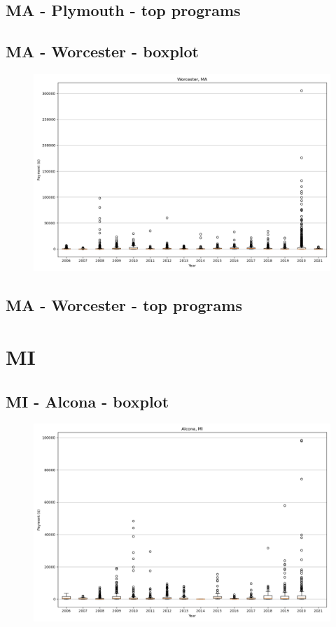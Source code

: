 \subsection*{MA - Plymouth - top programs}

\newpage
\subsection*{MA - Worcester - boxplot}
\begin{figure}[h]
\centering
\includegraphics[width=7in]{../output/boxplots/counties/Worcester-MA_boxplot.png}
\end{figure}


\subsection*{MA - Worcester - top programs}

\newpage
\section*{MI}
\subsection*{MI - Alcona - boxplot}
\begin{figure}[h]
\centering
\includegraphics[width=7in]{../output/boxplots/counties/Alcona-MI_boxplot.png}
\end{figure}


